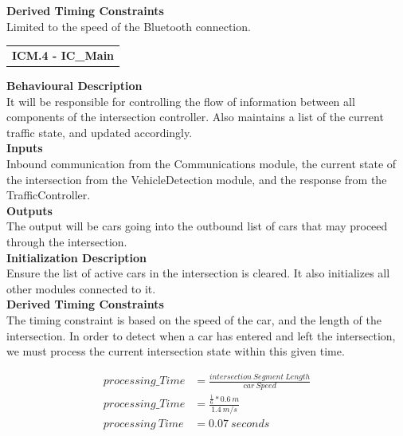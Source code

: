 \documentclass [10pt]{article}
\newcommand{\carSpeed}{1.4\ m/s}
\newcommand{\intersectionLength}{0.6\ m}
\begin{document}
\textbf{Derived Timing Constraints}\\
    Limited to the speed of the Bluetooth connection.\\




\begin{longtable}{p{}}
\rowcolor{tableCell}\textbf{ICM.4 - IC\_Main} \\
\end{longtable}

\textbf{Behavioural Description} \\
    It will be responsible for controlling the flow of information between all components of the intersection controller. Also maintains a list of the current traffic state, and updated accordingly. \\
    
\textbf{Inputs} \\
    Inbound communication from the Communications module, the current state of the intersection from the VehicleDetection module, and the response from the TrafficController. \\

\textbf{Outputs} \\
    The output will be cars going into the outbound list of cars that may proceed through the intersection. \\

\textbf{Initialization Description} \\
    Ensure the list of active cars in the intersection is cleared. It also initializes all other modules connected to it. \\

\textbf{Derived Timing Constraints} \\

The timing constraint is based on the speed of the car, and the length of the intersection. In order to detect when a car has entered and left the intersection, we must process the current intersection state within this given time.
     
    \begin{align*} 
       processing\_Time & = \frac{intersection\ Segment\ Length}{car\ Speed}\\
       processing\_Time & = \frac{ \frac{1}{6} * \intersectionLength }{\carSpeed}\\
       processing \ Time & = 0.07\ seconds\\
    \end{align*}
  
\end{document}
